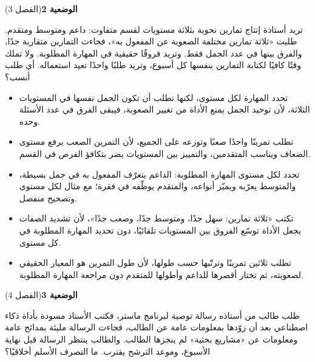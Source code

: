 \documentclass[11pt,a4paper]{article}
\begin{document}
\par\vspace{6pt}
\noindent
{\large\khatt\textbf{الوضعية 2}}\hfill{\small(الفصل 3)}\par\nopagebreak\vspace{3pt}
\setlength{\fboxsep}{7pt}\colorbox{gray!10}{\parbox{\dimexpr\linewidth-14pt}{تريد أستاذة إنتاج تمارين نحوية بثلاثة مستويات لقسم متفاوت: داعم ومتوسط ومتقدم. طلبت «ثلاثة تمارين مختلفة الصعوبة عن المفعول به»، فجاءت التمارين متقاربة جدًا، والفرق بينها في عدد الجمل فقط. وتريد فروقًا حقيقية في المهارة المطلوبة. ولا تملك وقتًا كافيًا لكتابة التمارين بنفسها كل أسبوع، وتريد طلبًا واحدًا تعيد استعماله. أي طلب أنسب؟}}\par\nopagebreak
\begin{itemize}[leftmargin=1.0cm, labelsep=6pt, itemsep=3pt, topsep=4pt, parsep=0pt]
  \item[\textbf{أ)}] تحدد المهارة لكل مستوى، لكنها تطلب أن تكون الجمل نفسها في المستويات الثلاثة، لأن توحيد الجمل يمنع الأداة من تغيير الصعوبة، فيبقى الفرق في عدد الأسئلة وحده.
  \item[\textbf{ب)}] تطلب تمرينًا واحدًا صعبًا وتوزعه على الجميع، لأن التمرين الصعب يرفع مستوى الضعاف ويناسب المتقدمين، والتمييز بين المستويات يضر بتكافؤ الفرص في القسم.
  \item[\textbf{ج)}] تحدد لكل مستوى المهارة المطلوبة: الداعم يتعرّف المفعول به في جمل بسيطة، والمتوسط يعرّبه ويميّز أنواعه، والمتقدم يوظّفه في فقرة؛ مع مثال لكل مستوى وتصحيح منفصل.
  \item[\textbf{د)}] تكتب «ثلاثة تمارين: سهل جدًا، ومتوسط جدًا، وصعب جدًا»، لأن تشديد الصفات يجعل الأداة توسّع الفروق بين المستويات تلقائيًا، دون تحديد المهارة المطلوبة في كل مستوى.
  \item[\textbf{هـ)}] تطلب ثلاثين تمرينًا وترتّبها حسب طولها، لأن طول التمرين هو المعيار الحقيقي لصعوبته، ثم تختار أقصرها للداعم وأطولها للمتقدم دون مراجعة المهارة المطلوبة.
\end{itemize}
\par\vspace{6pt}
\noindent
{\large\khatt\textbf{الوضعية 3}}\hfill{\small(الفصل 4)}\par\nopagebreak\vspace{3pt}
\setlength{\fboxsep}{7pt}\colorbox{gray!10}{\parbox{\dimexpr\linewidth-14pt}{طلب طالب من أستاذه رسالة توصية لبرنامج ماستر، فكتب الأستاذ مسودة بأداة ذكاء اصطناعي بعد أن زوّدها بمعلومات عامة عن الطالب، فجاءت الرسالة مليئة بمدائح عامة ومعلومات عن «مشاريع بحثية» لم ينجزها الطالب. والطالب ينتظر الرسالة قبل نهاية الأسبوع، وموعد الترشح يقترب. ما التصرف الأسلم أخلاقيًا؟}}\par\nopagebreak
\end{document}
